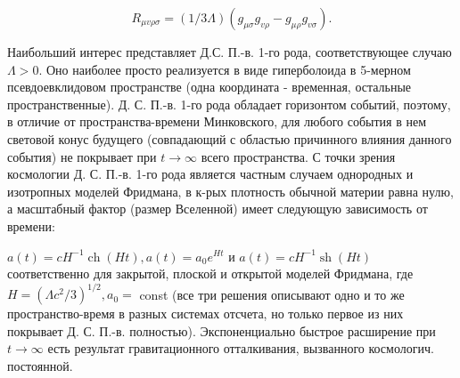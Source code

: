 \documentclass[10pt]{article}
\begin{document}
\[

R_{\mu v \rho \sigma}=(1 / 3 \Lambda)\left(g_{\mu \sigma} g_{v \rho}-g_{\mu \rho} g_{v \sigma}\right) .

\]



Наибольший интерес представляет Д.С. П.-в. 1-го рода, соответствующее случаю $\Lambda>0$. Оно наиболее просто реализуется в виде гиперболоида в 5-мерном псевдоевклидовом пространстве (одна координата - временная, остальные пространственные). Д. С. П.-в. 1-го рода обладает горизонтом событий, поэтому, в отличие от пространства-времени Минковского, для любого события в нем световой конус будущего (совпадающий с областью причинного влияния данного события) не покрывает при $t \rightarrow \infty$ всего пространства. С точки зрения космологии Д. С. П.-в. 1-го рода является частным случаем однородных и изотропных моделей Фридмана, в к-рых плотность обычной материи равна нулю, а масштабный фактор (размер Вселенной) имеет следующую зависимость от времени:



$a(t)=c H^{-1} \operatorname{ch}(H t), a(t)=a_{0} e^{H t}$ и $a(t)=c H^{-1} \operatorname{sh}(H t)$ соответственно для закрытой, плоской и открытой моделей Фридмана, где $H=\left(\Lambda c^{2} / 3\right)^{1 / 2}, a_{0}=$ const (все три решения описывают одно и то же пространство-время в разных системах отсчета, но только первое из них покрывает Д. С. П.-в. полностью). Экспоненциально быстрое расширение при $t \rightarrow \infty$ есть результат гравитационного отталкивания, вызванного космологич. постоянной.
\end{document}
